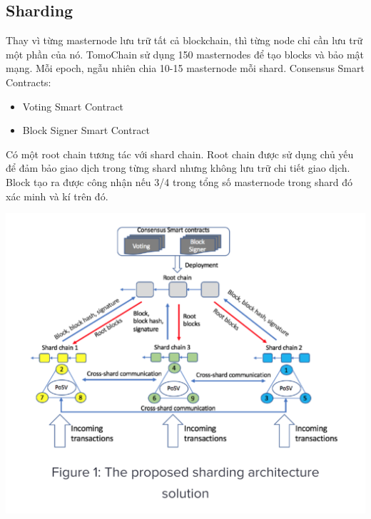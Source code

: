 \documentclass[12pt,a4paper]{article}
\begin{document}
		\subsection{Sharding}
		Thay vì từng masternode lưu trữ tất cả blockchain, thì từng node chỉ cần lưu trữ một phần của nó.
		TomoChain sử dụng 150 masternodes để tạo blocks và bảo mật mạng. Mỗi epoch, ngẫu nhiên chia 10-15 masternode mỗi shard.
		Consensus Smart Contracts:
		\begin{itemize}		
			\item Voting Smart Contract
			\item Block Signer Smart Contract
		\end{itemize}
		Có một root chain tương tác với shard chain. Root chain được sử dụng chủ yếu để đảm bảo giao dịch trong từng shard nhưng không lưu trữ chi tiết giao dịch. Block tạo ra được công nhận nếu 3/4 trong tổng số masternode trong shard đó xác minh và kí trên đó.
		\begin{center}
			\includegraphics[width=\linewidth]{sharding.png} 
		\end{center}
\end{document}
